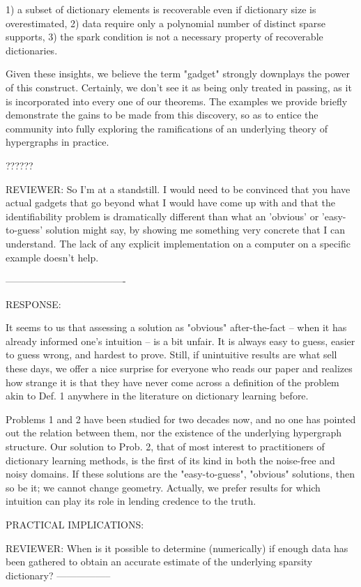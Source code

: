 1) a subset of dictionary elements is recoverable even if dictionary size is overestimated,
2) data require only a polynomial number of distinct sparse supports,
3) the spark condition is not a necessary property of recoverable dictionaries.

Given these insights, we believe the term "gadget" strongly downplays the power of this construct. Certainly, we don't see it as being only treated in passing, as it is incorporated into every one of our theorems. The examples we provide briefly demonstrate the gains to be made from this discovery, so as to entice the community into fully exploring the ramifications of an underlying theory of hypergraphs in practice. 

??????

REVIEWER: So I'm at a standstill. I would need to be convinced that you have actual
gadgets that go beyond what I would have come up with and that the
identifiability problem is dramatically different than what an 'obvious' or
'easy-to-guess' solution might say, by showing me something very concrete
that I can understand. The lack of any explicit implementation on a
computer on a specific example doesn't help.

-------------------------------------

RESPONSE:

It seems to us that assessing a solution as "obvious" after-the-fact -- when it has already informed one's intuition -- is a bit unfair. It is always easy to guess, easier to guess wrong, and hardest to prove. Still, if unintuitive results are what sell these days, we offer a nice surprise for everyone who reads our paper and realizes how strange it is that they have never come across a definition of the problem akin to Def. 1 anywhere in the literature on dictionary learning before.

Problems 1 and 2 have been studied for two decades now, and no one has pointed out the relation between them, nor the existence of the underlying hypergraph structure. Our solution to Prob. 2, that of most interest to practitioners of dictionary learning methods, is the first of its kind in both the noise-free and noisy domains. If these solutions are the "easy-to-guess", "obvious" solutions, then so be it; we cannot change geometry. Actually, we prefer results for which intuition can play its role in lending credence to the truth.




PRACTICAL IMPLICATIONS:

REVIEWER: When is it possible to determine (numerically) if enough data has been gathered to obtain an accurate estimate of the underlying sparsity dictionary?
-----------------

